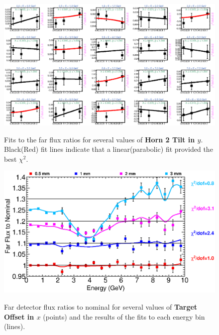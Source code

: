 {\begin{figure}[ht]
  \begin{center}
    {\includegraphics[width=5.0in]{figures/Horn2YTilt_far_fits.eps}}
  \end{center}
\caption{ Fits to the far flux ratios for several values of {\bf Horn 2 Tilt in $y$}. Black(Red) fit lines indicate that a linear(parabolic) fit provided the best $\chi^2$. }
\end{figure}

\begin{figure}[ht]
  \begin{center}
    {\includegraphics[width=6.0in]{figures/TargetXOffset_far_summary.eps}}
  \end{center}
\caption{ Far detector flux ratios to nominal for several values of {\bf Target Offset in $x$} (points) and the results of the fits to each energy bin (lines).}
\end{figure}

}
